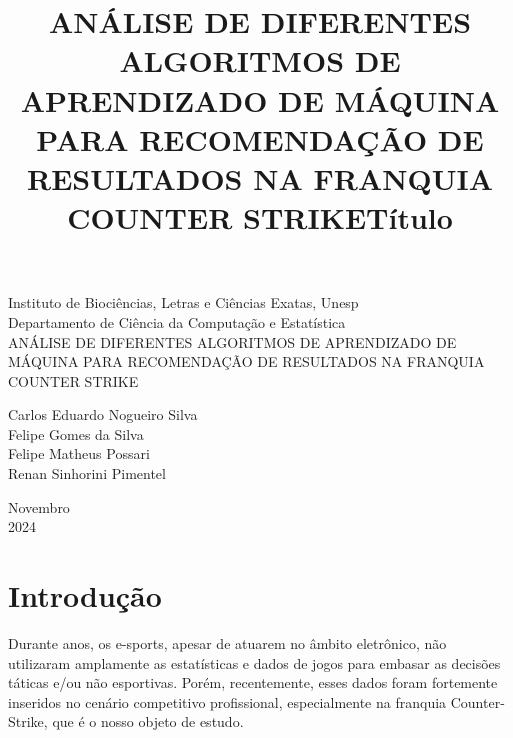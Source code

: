 \documentclass[a4paper,times,12pt]{article}
\begin{document}
\title{ANÁLISE DE DIFERENTES ALGORITMOS DE APRENDIZADO DE MÁQUINA PARA RECOMENDAÇÃO DE RESULTADOS NA FRANQUIA COUNTER STRIKE}
\begin{titlepage}
  \begin{center}


    \Huge{Instituto de Bioci\^{e}ncias, Letras e Ci\^{e}ncias Exatas, Unesp}\\
    \large{Departamento de Ciência da Computação e Estatística}\\ 

    \vspace{15pt}
    \vspace{95pt}
    {\LARGE{ANÁLISE DE DIFERENTES ALGORITMOS DE APRENDIZADO DE MÁQUINA PARA RECOMENDAÇÃO DE RESULTADOS NA FRANQUIA COUNTER STRIKE}} \\
    \title{{\large{Título}}}
    \vspace{3,5cm}
    Carlos Eduardo Nogueiro Silva\\
    Felipe Gomes da Silva \\
    Felipe Matheus Possari \\
    Renan Sinhorini Pimentel \\
  \end{center}


  \vspace{1cm}
  \begin{center}
    \vspace{\fill}
    Novembro\\
    2024
  \end{center}
\end{titlepage}
\newpage
\tableofcontents
\thispagestyle{empty}
\newpage


\section{Introdução}
\hspace{+15pt} 
Durante anos, os e-sports, apesar de atuarem no âmbito eletrônico, não utilizaram amplamente as estatísticas e dados de jogos para embasar as decisões táticas e/ou não esportivas. Porém, recentemente, esses dados foram fortemente inseridos no cenário competitivo profissional, especialmente na franquia Counter-Strike, que é o nosso objeto de estudo.
\end{document}
